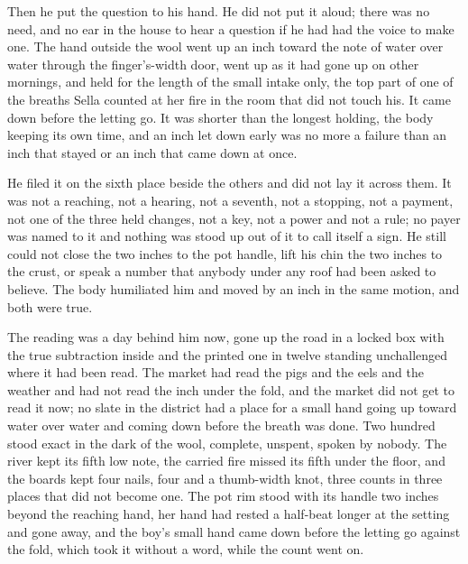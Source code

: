 Then he put the question to his hand. He did not put it aloud; there was no need, and no ear in the house to hear a question if he had had the voice to make one. The hand outside the wool went up an inch toward the note of water over water through the finger's-width door, went up as it had gone up on other mornings, and held for the length of the small intake only, the top part of one of the breaths Sella counted at her fire in the room that did not touch his. It came down before the letting go. It was shorter than the longest holding, the body keeping its own time, and an inch let down early was no more a failure than an inch that stayed or an inch that came down at once.

He filed it on the sixth place beside the others and did not lay it across them. It was not a reaching, not a hearing, not a seventh, not a stopping, not a payment, not one of the three held changes, not a key, not a power and not a rule; no payer was named to it and nothing was stood up out of it to call itself a sign. He still could not close the two inches to the pot handle, lift his chin the two inches to the crust, or speak a number that anybody under any roof had been asked to believe. The body humiliated him and moved by an inch in the same motion, and both were true.

The reading was a day behind him now, gone up the road in a locked box with the true subtraction inside and the printed one in twelve standing unchallenged where it had been read. The market had read the pigs and the eels and the weather and had not read the inch under the fold, and the market did not get to read it now; no slate in the district had a place for a small hand going up toward water over water and coming down before the breath was done. Two hundred stood exact in the dark of the wool, complete, unspent, spoken by nobody. The river kept its fifth low note, the carried fire missed its fifth under the floor, and the boards kept four nails, four and a thumb-width knot, three counts in three places that did not become one. The pot rim stood with its handle two inches beyond the reaching hand, her hand had rested a half-beat longer at the setting and gone away, and the boy's small hand came down before the letting go against the fold, which took it without a word, while the count went on.
